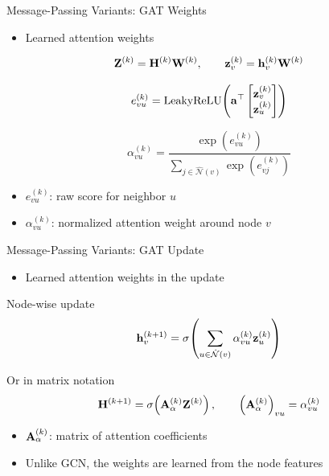 \documentclass[10pt,aspectratio=169]{ntuabeamer}
\begin{document}
\begin{frame}{Message-Passing Variants: GAT Weights}
  \small
  \begin{itemize}
    \item Learned attention weights
  \end{itemize}
  \[
    \mathbf{Z}^{(k)} = \mathbf{H}^{(k)} \mathbf{W}^{(k)}, \qquad
    \mathbf{z}_{v}^{(k)} = \mathbf{h}_{v}^{(k)} \mathbf{W}^{(k)}
  \]

  \vspace{-0.18cm}
  \[
    e_{vu}^{(k)} =
    \operatorname{LeakyReLU}\!\left(
      \mathbf{a}^{\top}
      \begin{bmatrix}
        \mathbf{z}_{v}^{(k)} \\
        \mathbf{z}_{u}^{(k)}
      \end{bmatrix}
    \right)
  \]

  \vspace{-0.18cm}
  \[
    \alpha_{vu}^{(k)} =
    \frac{\exp\!\left(e_{vu}^{(k)}\right)}
    {\sum_{j \in \hat{\mathcal N}(v)} \exp\!\left(e_{vj}^{(k)}\right)}
  \]

  \begin{itemize}
    \item \(e_{vu}^{(k)}\): raw score for neighbor \(u\)
    \item \(\alpha_{vu}^{(k)}\): normalized attention weight around node \(v\)
  \end{itemize}
\end{frame}

\begin{frame}{Message-Passing Variants: GAT Update}
  \small
  \begin{itemize}
    \item Learned attention weights in the update
  \end{itemize}

  \textcolor{ntuablue}{Node-wise update}
  \[
    \mathbf{h}_{v}^{(k+1)} =
    \sigma\!\left(
      \sum_{u \in \hat{\mathcal N}(v)}
      \alpha_{vu}^{(k)} \mathbf{z}_{u}^{(k)}
    \right)
  \]

  \textcolor{ntuablue}{Or in matrix notation}
  \[
    \mathbf{H}^{(k+1)} = \sigma\!\left(\mathbf{A}_{\alpha}^{(k)} \mathbf{Z}^{(k)}\right),
    \qquad
    {\left(\mathbf{A}_{\alpha}^{(k)}\right)}_{vu} = \alpha_{vu}^{(k)}
  \]

  \begin{itemize}
    \item \(\mathbf{A}_{\alpha}^{(k)}\): matrix of attention coefficients
    \item Unlike GCN, the weights are learned from the node features
  \end{itemize}
\end{frame}
\end{document}
